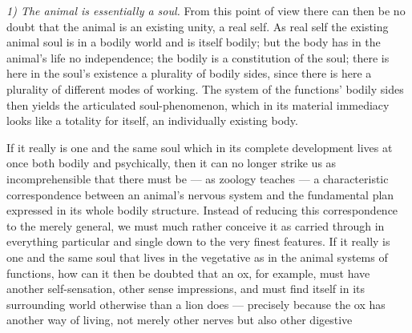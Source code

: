 \documentclass[12pt,a4paper]{book}
\begin{document}
\emph{1) The animal is essentially a soul.} From this point of view there can then be
no doubt that the animal is an existing unity, a real self. As real self the existing
animal soul is in a bodily world and is itself bodily; but the body has in the
animal's life no independence; the bodily is a constitution of the soul; there is here
in the soul's existence a plurality of bodily sides, since there is here a plurality
of different modes of working. The system of the functions' bodily sides then yields
the articulated soul-phenomenon, which in its material immediacy looks like a totality
for itself, an individually existing body.

\setcounter{footnote}{0}
If it really is one and the same soul which in its complete development lives at once
both bodily and psychically, then it can no longer strike us as incomprehensible that
there must be --- as zoology teaches --- a characteristic correspondence between an
animal's nervous system and the fundamental plan expressed in its whole bodily
structure. Instead of reducing this correspondence to the merely general, we must much
rather conceive it as carried through in everything particular and single down to the
very finest features. If it really is one and the same soul that lives in the
vegetative as in the animal systems of functions, how can it then be doubted that an
ox, for example, must have another self-sensation, other sense impressions, and must
find itself in its surrounding world otherwise than a lion does --- precisely because
the ox has another way of living, not merely other nerves but also other digestive
\end{document}
